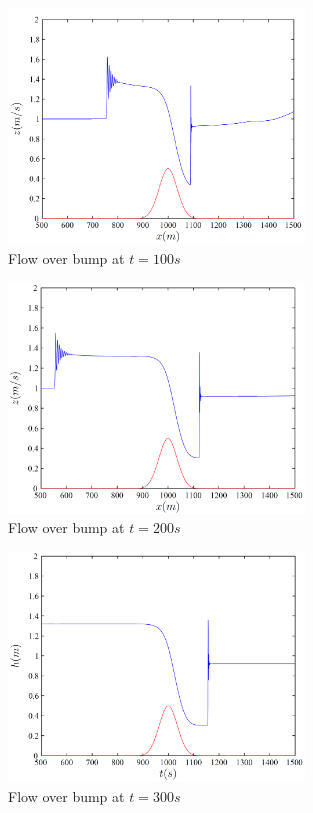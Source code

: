 \documentclass[handout]{beamer}
\begin{document}
\begin{frame}
	\begin{figure}
		\includegraphics[width=0.7\textwidth]{./Figures/Serret=100s.png}
		\caption{Flow over bump at $t= 100s$}
	\end{figure}
\end{frame}

\begin{frame}
	\begin{figure}
		\includegraphics[width=0.7\textwidth]{./Figures/Serret=200s.png}
		\caption{Flow over bump at $t= 200s$}
	\end{figure}
\end{frame}

\begin{frame}
	\begin{figure}
		\includegraphics[width=0.7\textwidth]{./Figures/Serret=300s.png}
		\caption{Flow over bump at $t= 300s$}
	\end{figure}
\end{frame}
\end{document}
